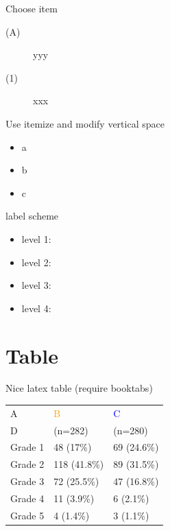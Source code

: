 \documentclass[table]{beamer}
\begin{document}
\begin{frame}[label={sec:orgc226d44}]{Choose item}
\begin{description}
\item[{(A)}] yyy
\item[{(1)}] xxx
\end{description}
\end{frame}

\begin{frame}[label={sec:org25b4362}]{Use itemize and modify vertical space}
\begin{itemize}[label={-},topsep=0pt,itemsep=0mm]
\item a
\item b
\item c
\end{itemize}
\end{frame}


\begin{frame}[label={sec:orgdd1818b}]{label scheme}
\begin{itemize}
\item level 1: \textbullet
\item level 2: \textendash
\item level 3: \textasteriskcentered
\item level 4: \textperiodcentered
\end{itemize}
\end{frame}

\section{Table}
\label{sec:org302098c}
\begin{frame}[label={sec:org56dae6a}]{Nice latex table}
(require booktabs)

\begin{table}
\begin{tabular}{lll}
\toprule
A  & \textcolor{orange}{B} & \textcolor{blue}{C} \\
D & (n=282)  & (n=280) \\
\midrule
Grade 1 & 48 (17\%)  & 69 (24.6\%) \\
Grade 2 & 118 (41.8\%)  & 89 (31.5\%) \\
Grade 3 & 72 (25.5\%)  & 47 (16.8\%) \\
Grade 4 & 11 (3.9\%) & 6 (2.1\%) \\
Grade 5 & 4 (1.4\%)  & 3 (1.1\%) \\
\bottomrule
\end{tabular}
\end{table}
\end{frame}
\end{document}
